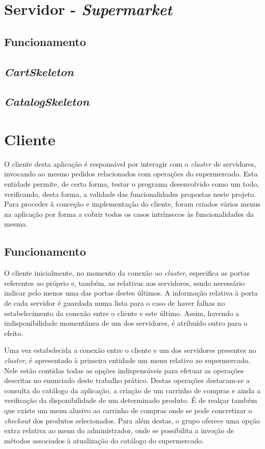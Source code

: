 \documentclass[a4paper]{report}
\begin{document}
{	\section{Servidor - \textit{Supermarket}} \label{sec:Server}
		\subsection{Funcionamento} \label{subsec:ServerWorking}
		\subsection{\textit{CartSkeleton}} \label{subsec:ServerCartSkeleton}
		\subsection{\textit{CatalogSkeleton}} \label{subsec:ServerCatalogSkeleton}
	
	\section{Cliente} \label{sec:Client}
		O cliente desta aplicação é responsável por interagir com o \textit{cluster} de servidores, invocando ao mesmo pedidos relacionados com operações do supermercado.
		Esta entidade permite, de certa forma, testar o programa desenvolvido como um todo, verificando, desta forma, a validade das funcionalidades propostas neste projeto.
		Para proceder à conceção e implementação do cliente, foram criados vários menus na aplicação por forma a cobrir todos os casos intrínsecos às funcionalidades da mesma.

		\subsection{Funcionamento} \label{subsec:ClientWorking}
		O cliente inicialmente, no momento da conexão ao \textit{cluster}, especifica as portas referentes ao próprio e, também, as relativas aos servidores, sendo necessário indicar pelo menos uma das portas destes últimos.
		A informação relativa à porta de cada servidor é guardada numa lista para o caso de haver falhas no estabelecimento da conexão entre o cliente e este último. Assim, havendo a indisponibilidade momentânea de um dos servidores, é atribuído outro para o efeito.

		Uma vez estabelecida a conexão entre o cliente e um dos servidores presentes no \textit{cluster}, é apresentado à primeira entidade um menu relativo ao supermercado. Nele estão contidas todas as opções indispensáveis para efetuar as operações descritas no enunciado deste trabalho prático.
		Destas operações destacam-se a consulta do catálogo da aplicação, a criação de um carrinho de compras e ainda a verificação da disponibilidade de um determinado produto.
		É de realçar também que existe um menu alusivo ao carrinho de compras onde se pode concretizar o \textit{checkout} dos produtos selecionados.
		Para além destas, o grupo oferece uma opção extra relativa ao menu do administrador, onde se possibilita a invoção de métodos associados à atualização do catálogo do supermercado.

}
\end{document}
